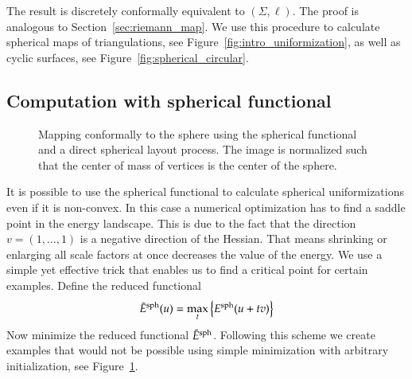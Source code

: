 \documentclass[Thesis]{subfiles}
\begin{document}
The result is discretely conformally equivalent to $(\Sigma, \ell)$. The proof is analogous to Section~\ref{sec:riemann_map}.
We use this procedure to calculate spherical maps of triangulations, see Figure~\ref{fig:intro_uniformization}, as well as cyclic surfaces, see Figure~\ref{fig:spherical_circular}.


\subsection{Computation with spherical functional}
\label{sec:spherical_computation}

\begin{figure}
\centering
{}
\quad\quad\quad{}
\caption{Mapping conformally to the sphere using the spherical functional and a direct spherical layout process. The image is normalized such that the center of mass of vertices is the center of the sphere.}
\label{fig:spherical_examples}
\end{figure}

It is possible to use the spherical functional to calculate spherical uniformizations even if it is non-convex. In this case a numerical optimization has to find a saddle point in the energy landscape. This is due to the fact that the direction $v=(1,\ldots,1)$ is a negative direction of the Hessian. That means shrinking or enlarging all scale factors at once decreases the value of the energy. We use a simple yet effective trick that enables us to find a critical point for certain examples. Define the reduced functional
\begin{equation}
\label{eq:reduced_spherical}
\tilde E^{\rm sph}(u)=\max_t \left\{E^{\rm sph}(u + tv)\right\}
\end{equation}
Now minimize the reduced functional $\tilde  E^{\rm sph}$. 
Following this scheme we create examples that would not be possible using simple minimization with arbitrary initialization, see Figure~\ref{fig:spherical_examples}.
\end{document}
